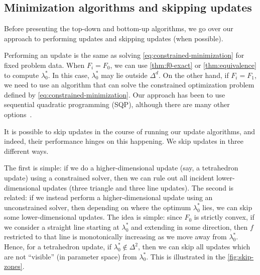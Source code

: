 \documentclass[eikonal.tex]{subfiles}
\begin{document}
\subsection{Minimization algorithms and skipping
  updates}\label{ssec:algorithms-and-skipping}

Before presenting the top-down and bottom-up algorithms, we go over
our approach to performing updates and skipping updates (when
possible).

Performing an update is the same as solving
\cref{eq:constrained-minimization} for fixed problem data. When
$F_i = F_0$, we can use \cref{thm:f0-exact} or \cref{thm:equivalence}
to compute $\lambda_0^*$. In this case, $\lambda_0^*$ may lie outside
$\Delta^d$. On the other hand, if $F_i = F_1$, we need to use an
algorithm that can solve the constrained optimization problem defined
by \cref{eq:constrained-minimization}. Our approach has been to use
sequential quadratic programming (SQP), although there are many other
options~\cite{bertsekas1999nonlinear,nocedal2006numerical}.

It is possible to skip updates in the course of running our update
algorithms, and indeed, their performance hinges on this happening. We
skip updates in three different ways.

The first is simple: if we do a higher-dimensional update (say, a
tetrahedron update) using a constrained solver, then we can rule out
all incident lower-dimensional updates (three triangle and three line
updates). The second is related: if we instead perform a
higher-dimensional update using an unconstrained solver, then
depending on where the optimum $\lambda_0^*$ lies, we can skip some
lower-dimensional updates. The idea is simple: since $F_0$ is strictly
convex, if we consider a straight line starting at $\lambda_0^*$ and
extending in some direction, then $f$ restricted to that line is
monotonically increasing as we move away from $\lambda_0^*$. Hence,
for a tetrahedron update, if $\lambda_0^* \notin \Delta^2$, then we
can skip all updates which are not ``visible'' (in parameter space)
from $\lambda_0^*$. This is illustrated in the \cref{fig:skip-zones}.
\end{document}
